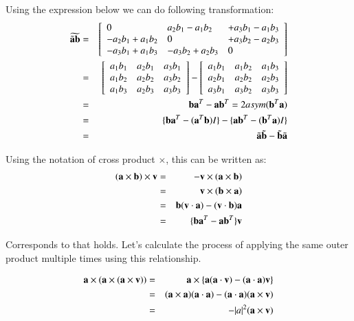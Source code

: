 Using the expression below we can do following transformation:
%
\begin{eqnarray}
\widetilde{\tilde{\mathbf{a}}\mathbf{b}}
&=&
\left[\begin{array}{lll}
0 & a_2b_1-a_1b_2 & +a_3b_1-a_1b_3 \\
-a_2b_1+a_1b_2 & 0 & +a_3b_2-a_2b_3 \\
-a_3b_1+a_1b_3 & -a_3b_2+a_2b_3 & 0
\end{array}\right]\\
&=&
\left[\begin{array}{lll}
a_1b_1 & a_2b_1 & a_3b_1 \\
a_1b_2 & a_2b_2 & a_3b_2 \\
a_1b_3 & a_2b_3 & a_3b_3
\end{array}\right]
-  \left[\begin{array}{lll}
a_1b_1 & a_1b_2 & a_1b_3 \\
a_2b_1 & a_2b_2 & a_2b_3 \\
a_3b_1 & a_3b_2 & a_3b_3
\end{array}\right]\\
&=& \mathbf{b}\mathbf{a}^T - \mathbf{a}\mathbf{b}^T = 2 asym(\mathbf{b}^T\mathbf{a})\\
&=& \{\mathbf{b}\mathbf{a}^T-(\mathbf{a}^T\mathbf{b})I\} - \{\mathbf{a}\mathbf{b}^T-(\mathbf{b}^T\mathbf{a})I\}\\
&=& \tilde{\mathbf{a}}\tilde{\mathbf{b}} - \tilde{\mathbf{b}}\tilde{\mathbf{a}}
\end{eqnarray}

Using the notation of cross product $\times$, this can be written as:
%
\begin{eqnarray}
(\mathbf{a} \times \mathbf{b}) \times \mathbf{v}
&=& - \mathbf{v} \times (\mathbf{a} \times \mathbf{b})\\
&=& \mathbf{v} \times ( \mathbf{b}\times \mathbf{a})\\
&=& \mathbf{b}(\mathbf{v} \cdot \mathbf{a} )-(\mathbf{v}\cdot \mathbf{b})\mathbf{a}\\
&=& \{ \mathbf{b}\mathbf{a}^T- \mathbf{a}\mathbf{b}^T\} \mathbf{v}
\end{eqnarray}

Corresponds to that holds. Let's calculate the process of applying the same outer product multiple times using this relationship.

\begin{eqnarray}
\mathbf{a}\times (\mathbf{a}\times (\mathbf{a}\times \mathbf{v}))
&=& \mathbf{a}\times\{\mathbf{a}(\mathbf{a}\cdot \mathbf{v})-(\mathbf{a}\cdot \mathbf{a})\mathbf{v}\}\\
&=& (\mathbf{a}\times \mathbf{a})(\mathbf{a}\cdot \mathbf{a})-(\mathbf{a}\cdot \mathbf{a})(\mathbf{a}\times \mathbf{v})\\
&=& -|a|^2(\mathbf{a}\times \mathbf{v})
\end{eqnarray}

